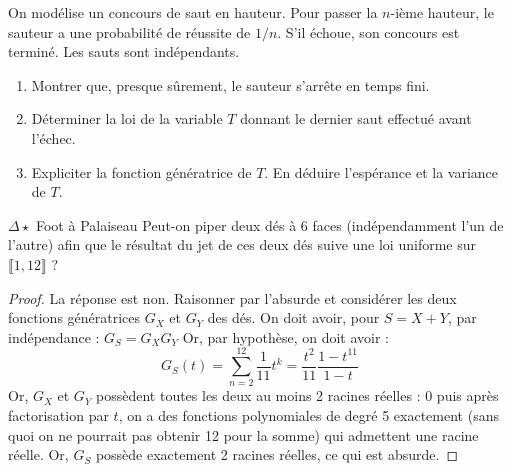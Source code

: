 \documentclass[french,a4paper]{article}
\theoremstyle{plain}
\theoremstyle{definition}
\theoremstyle{remark}
\begin{document}
\begin{ex}[Moulin.69]{}
	On modélise un concours de saut en hauteur. Pour passer la $n$-ième hauteur, le sauteur a une probabilité de réussite de $1/n$. S'il échoue, son concours est terminé. Les sauts sont indépendants.
	\begin{enumerate}
		\item Montrer que, presque sûrement, le sauteur s'arrête en temps fini.
		\item Déterminer la loi de la variable $T$ donnant le dernier saut effectué avant l'échec.
		\item Expliciter la fonction génératrice de $T$. En déduire l'espérance et la variance de $T$.
	\end{enumerate}
\end{ex}

\begin{ex}{$\Delta\star$ Foot à Palaiseau}
	Peut-on piper deux dés à $6$ faces (indépendamment l'un de l'autre) afin que le résultat du jet de ces deux dés suive une loi uniforme sur $\llbracket1,12\rrbracket$ ?
\end{ex}
\begin{proof}
	La réponse est non. Raisonner par l'absurde et considérer les deux fonctions génératrices $G_X$ et $G_Y$ des dés. On doit avoir, pour $S=X+Y$, par indépendance : $G_S=G_XG_Y$ Or, par hypothèse, on doit avoir : $$G_S(t)=\sum_{n=2}^{12}\frac{1}{11}t^k=\frac{t^2}{11}\frac{1-t^{11}}{1-t}$$ Or, $G_X$ et $G_Y$ possèdent toutes les deux au moins 2 racines réelles : $0$ puis après factorisation par $t$, on a des fonctions polynomiales de degré 5 exactement (sans quoi on ne pourrait pas obtenir 12 pour la somme) qui admettent une racine réelle. Or, $G_S$ possède exactement 2 racines réelles, ce qui est absurde.
\end{proof}
\end{document}

